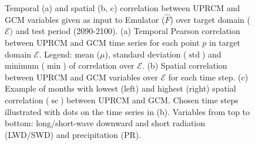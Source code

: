 \documentclass[a4paper,11pt,oneside]{report}
\begin{document}
\begin{figure}[tbp]
\begin{subfigure}[b]{\columnwidth}
        \end{subfigure}
        \hfill
        \caption[]
        {\small Temporal (a) and spatial (b, c) correlation between UPRCM and GCM variables given as input to Emulator ($\hat{F}$) over target domain ($\mathcal{E})$ and test period (2090-2100). (a) Temporal Pearson correlation between UPRCM and GCM time series for each point $p$ in target domain $\mathcal{E}$. Legend: mean ($\mu$), standard deviation ($\operatorname{std}$) and minimum ($\operatorname{min}$) of correlation over $\mathcal{E}$. (b) Spatial correlation between UPRCM and GCM variables over $\mathcal{E}$ for each time step. (c) Example of months with lowest (left) and highest (right) spatial correlation ($\operatorname{sc}$) between UPRCM and GCM. Chosen time steps illustrated with dots on the time series in (b). Variables from top to bottom: long/short-wave downward and short radiation (LWD/SWD) and precipitation (PR).} 
        \label{fig:corr-GCM-RCM}
    \end{figure}

\end{document}
